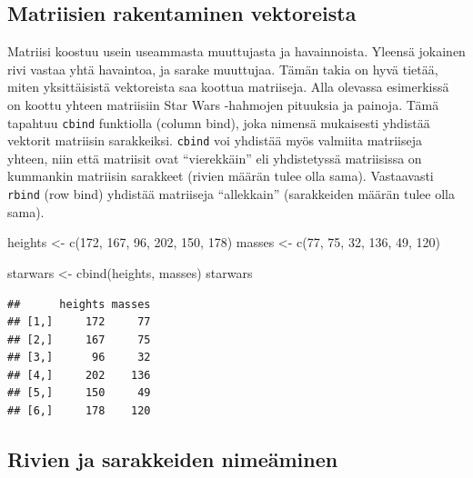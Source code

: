 \documentclass[
]{book}
\newenvironment{Shaded}{\begin{snugshade}}{\end{snugshade}}
\newcommand{\DecValTok}[1]{\textcolor[rgb]{0.00,0.00,0.81}{#1}}
\newcommand{\FunctionTok}[1]{\textcolor[rgb]{0.00,0.00,0.00}{#1}}
\newcommand{\NormalTok}[1]{#1}
\newcommand{\OtherTok}[1]{\textcolor[rgb]{0.56,0.35,0.01}{#1}}
\begin{document}
\hypertarget{matriisien-rakentaminen-vektoreista}{%
\subsection{Matriisien rakentaminen vektoreista}\label{matriisien-rakentaminen-vektoreista}}

Matriisi koostuu usein useammasta muuttujasta ja havainnoista. Yleensä jokainen rivi vastaa yhtä havaintoa, ja sarake muuttujaa. Tämän takia on hyvä tietää, miten yksittäisistä vektoreista saa koottua matriiseja. Alla olevassa esimerkissä on koottu yhteen matriisiin Star Wars -hahmojen pituuksia ja painoja. Tämä tapahtuu \texttt{cbind} funktiolla (column bind), joka nimensä mukaisesti yhdistää vektorit matriisin sarakkeiksi. \texttt{cbind} voi yhdistää myös valmiita matriiseja yhteen, niin että matriisit ovat ``vierekkäin'' eli yhdistetyssä matriisissa on kummankin matriisin sarakkeet (rivien määrän tulee olla sama). Vastaavasti \texttt{rbind} (row bind) yhdistää matriiseja ``allekkain'' (sarakkeiden määrän tulee olla sama).

\begin{Shaded}
\begin{Highlighting}[]
\NormalTok{heights }\OtherTok{\textless{}{-}} \FunctionTok{c}\NormalTok{(}\DecValTok{172}\NormalTok{, }\DecValTok{167}\NormalTok{, }\DecValTok{96}\NormalTok{, }\DecValTok{202}\NormalTok{, }\DecValTok{150}\NormalTok{, }\DecValTok{178}\NormalTok{)}
\NormalTok{masses }\OtherTok{\textless{}{-}} \FunctionTok{c}\NormalTok{(}\DecValTok{77}\NormalTok{, }\DecValTok{75}\NormalTok{, }\DecValTok{32}\NormalTok{, }\DecValTok{136}\NormalTok{, }\DecValTok{49}\NormalTok{, }\DecValTok{120}\NormalTok{)}

\NormalTok{starwars }\OtherTok{\textless{}{-}} \FunctionTok{cbind}\NormalTok{(heights, masses)}
\NormalTok{starwars}
\end{Highlighting}
\end{Shaded}

\begin{verbatim}
##      heights masses
## [1,]     172     77
## [2,]     167     75
## [3,]      96     32
## [4,]     202    136
## [5,]     150     49
## [6,]     178    120
\end{verbatim}

\hypertarget{rivien-ja-sarakkeiden-nimeuxe4minen}{%
\subsection{Rivien ja sarakkeiden nimeäminen}\label{rivien-ja-sarakkeiden-nimeuxe4minen}}
\end{document}
